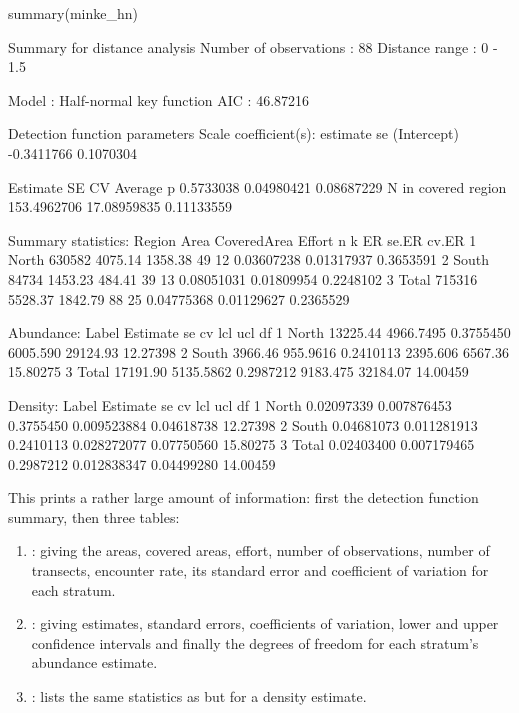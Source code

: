 \documentclass[article,shortnames]{jss}
\providecommand{\tightlist}{%
  \setlength{\itemsep}{0pt}\setlength{\parskip}{0pt}}
\begin{document}
\begin{CodeChunk}
\begin{CodeInput}
summary(minke_hn)
\end{CodeInput}
\begin{CodeOutput}

Summary for distance analysis 
Number of observations :  88 
Distance range         :  0  -  1.5 

Model : Half-normal key function 
AIC   : 46.87216 

Detection function parameters
Scale coefficient(s):  
              estimate        se
(Intercept) -0.3411766 0.1070304

                       Estimate          SE         CV
Average p             0.5733038  0.04980421 0.08687229
N in covered region 153.4962706 17.08959835 0.11133559

Summary statistics:
  Region   Area CoveredArea  Effort  n  k         ER      se.ER     cv.ER
1  North 630582     4075.14 1358.38 49 12 0.03607238 0.01317937 0.3653591
2  South  84734     1453.23  484.41 39 13 0.08051031 0.01809954 0.2248102
3  Total 715316     5528.37 1842.79 88 25 0.04775368 0.01129627 0.2365529

Abundance:
  Label Estimate        se        cv      lcl      ucl       df
1 North 13225.44 4966.7495 0.3755450 6005.590 29124.93 12.27398
2 South  3966.46  955.9616 0.2410113 2395.606  6567.36 15.80275
3 Total 17191.90 5135.5862 0.2987212 9183.475 32184.07 14.00459

Density:
  Label   Estimate          se        cv         lcl        ucl       df
1 North 0.02097339 0.007876453 0.3755450 0.009523884 0.04618738 12.27398
2 South 0.04681073 0.011281913 0.2410113 0.028272077 0.07750560 15.80275
3 Total 0.02403400 0.007179465 0.2987212 0.012838347 0.04499280 14.00459
\end{CodeOutput}
\end{CodeChunk}

This prints a rather large amount of information: first the detection
function summary, then three tables:

\begin{enumerate}
\def\labelenumi{\arabic{enumi}.}
\tightlist
\item
  : giving the areas, covered areas, effort,
  number of observations, number of transects, encounter rate, its
  standard error and coefficient of variation for each stratum.
\item
  : giving estimates, standard errors, coefficients of
  variation, lower and upper confidence intervals and finally the
  degrees of freedom for each stratum's abundance estimate.
\item
  : lists the same statistics as  but for
  a density estimate.
\end{enumerate}
\end{document}

